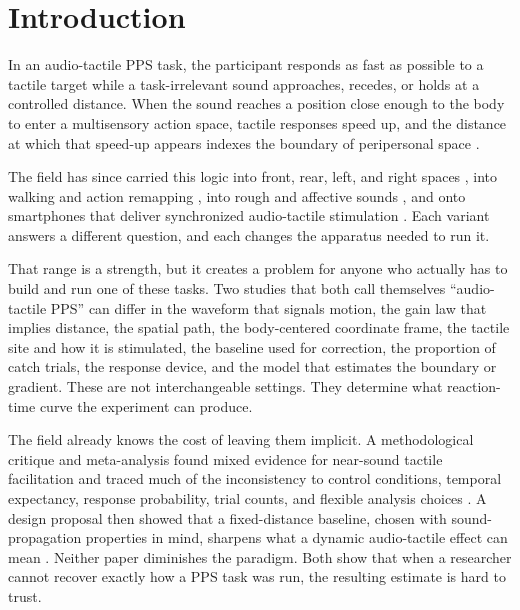 \documentclass[pdflatex,sn-apa]{sn-jnl}
\begin{document}

\maketitle

\section{Introduction}

In an audio-tactile PPS task, the participant responds as fast as possible to a tactile target while a task-irrelevant sound approaches, recedes, or holds at a controlled distance. When the sound reaches a position close enough to the body to enter a multisensory action space, tactile responses speed up, and the distance at which that speed-up appears indexes the boundary of peripersonal space \citep{Canzoneri2012}.

The field has since carried this logic into front, rear, left, and right spaces \citep{Matsuda2021,Amiel2025,Teraoka2024}, into walking and action remapping \citep{Noel2015}, into rough and affective sounds \citep{Taffou2021,Bahadori2021}, and onto smartphones that deliver synchronized audio-tactile stimulation \citep{Roussel2025}. Each variant answers a different question, and each changes the apparatus needed to run it.

That range is a strength, but it creates a problem for anyone who actually has to build and run one of these tasks. Two studies that both call themselves ``audio-tactile PPS'' can differ in the waveform that signals motion, the gain law that implies distance, the spatial path, the body-centered coordinate frame, the tactile site and how it is stimulated, the baseline used for correction, the proportion of catch trials, the response device, and the model that estimates the boundary or gradient. These are not interchangeable settings. They determine what reaction-time curve the experiment can produce.

The field already knows the cost of leaving them implicit. A methodological critique and meta-analysis found mixed evidence for near-sound tactile facilitation and traced much of the inconsistency to control conditions, temporal expectancy, response probability, trial counts, and flexible analysis choices \citep{Holmes2020}. A design proposal then showed that a fixed-distance baseline, chosen with sound-propagation properties in mind, sharpens what a dynamic audio-tactile effect can mean \citep{Hobeika2019}. Neither paper diminishes the paradigm. Both show that when a researcher cannot recover exactly how a PPS task was run, the resulting estimate is hard to trust.
\end{document}
